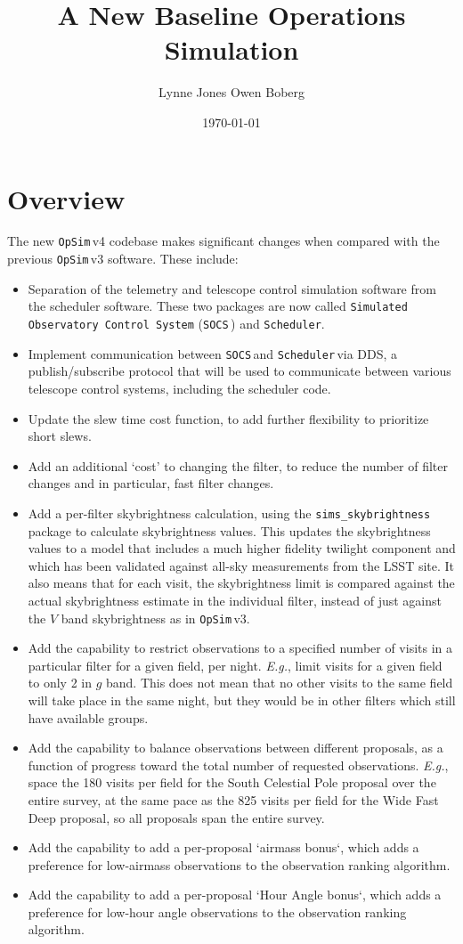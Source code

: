 \documentclass[DM,lsstdraft,authoryear,toc]{lsstdoc}
\title{A New Baseline Operations Simulation}
\author{%
Lynne Jones
Owen Boberg
}
\date{\today}
\newcommand{\opsim}{\texttt{OpSim}\,}
\newcommand{\socs}{\texttt{SOCS}\,}
\newcommand{\sched}{\texttt{Scheduler}\,}
\newcommand{\simsky}{\texttt{sims\_skybrightness}\,}
\begin{document}
\maketitle

\section{Overview}

The new \opsim v4 codebase makes significant changes when compared with the previous \opsim v3 software. These include: 
\begin{itemize}
\item Separation of the telemetry and telescope control simulation software from the scheduler software. These two packages are now called \texttt{Simulated Observatory Control System} (\socs) and \texttt{Scheduler}. 
\item Implement communication between \socs and \sched via DDS, a publish/subscribe protocol that will be used to communicate between various telescope control systems, including the scheduler code.
\item Update the slew time cost function, to add further flexibility to prioritize short slews.
\item Add an additional `cost' to changing the filter, to reduce the number of filter changes and in particular, fast filter changes.
\item Add a per-filter skybrightness calculation, using the \simsky package to calculate skybrightness values. This updates the skybrightness values to a model that includes a much higher fidelity twilight component and which has been validated against all-sky measurements from the LSST site. It also means that for each visit, the skybrightness limit is compared against the actual skybrightness estimate in the individual filter, instead of just against the $V$ band skybrightness as in \opsim v3.
\item Add the capability to restrict observations to a specified number of visits in a particular filter for a given field, per night. {\it E.g.}, limit visits for a given field to only 2 in $g$ band. This does not mean that no other visits to the same field will take place in the same night, but they would be in other filters which still have available groups. 
\item Add the capability to balance observations between different proposals, as a function of progress toward the total number of requested observations. {\it E.g.}, space the 180 visits per field for the South Celestial Pole proposal over the entire survey, at the same pace as the 825 visits per field for the Wide Fast Deep proposal, so all proposals span the entire survey.
\item Add the capability to add a per-proposal `airmass bonus`, which adds a preference for low-airmass observations to the observation ranking algorithm.
\item Add the capability to add a per-proposal `Hour Angle bonus`, which adds a preference for low-hour angle observations to the observation ranking algorithm. 
\end{itemize}
\end{document}
